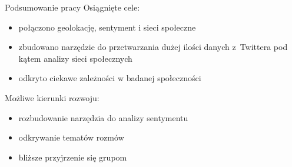 \documentclass{beamer}
\begin{document}
\appendix
\begin{frame}{Podsumowanie pracy}
Osiągnięte cele:
\begin{itemize}
\item połączono geolokację, sentyment i sieci społeczne
\item zbudowano narzędzie do przetwarzania dużej ilości danych z~Twittera pod
kątem analizy sieci społecznych
\item odkryto ciekawe zależności w badanej społeczności
\end{itemize}
\vspace{0.5cm}
Możliwe kierunki rozwoju:
\begin{itemize}
\item rozbudowanie narzędzia do analizy sentymentu
\item odkrywanie tematów rozmów
\item bliższe przyjrzenie się grupom
\end{itemize} 
 
\end{frame} 
 
\end{document}
